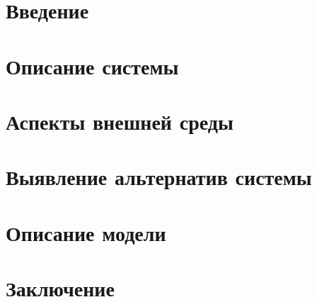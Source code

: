 \documentclass{article}
\begin{document}
\begin{large}
    
    \thispagestyle{empty}
    \newpage

    \tableofcontents
    \thispagestyle{empty}
    \newpage

    \section{Введение}
    

    \section{Описание системы}
    

    \section{Аспекты внешней среды}
    

    \section{Выявление альтернатив системы}
    

    \section{Описание модели}
    

    \section{Заключение}
    
\end{large}
\end{document}
